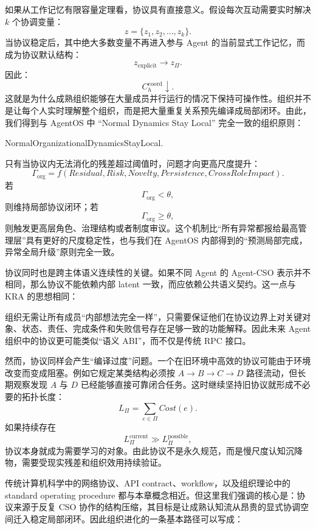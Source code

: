 如果从工作记忆有限容量定理看，协议具有直接意义。假设每次互动需要实时解决 $k$ 个协调变量：
\[
z=\{z_1,z_2,\ldots,z_k\}.
\]
当协议稳定后，其中绝大多数变量不再进入参与 Agent 的当前显式工作记忆，而成为协议默认结构：
\[
z_{\mathrm{explicit}}
\rightarrow
z_{\Pi}.
\]
因此：
\[
C_h^{\mathrm{coord}}
\downarrow.
\]
这就是为什么成熟组织能够在大量成员并行运行的情况下保持可操作性。组织并不是让每个人实时理解整个组织，而是把大量重复关系预先编译成局部闭环。由此，我们得到与 AgentOS 中 ``Normal Dynamics Stay Local'' 完全一致的组织原则：
\begin{statementbox}
NormalOrganizationalDynamicsStayLocal.
\end{statementbox}
只有当协议内无法消化的残差超过阈值时，问题才向更高尺度提升：
\[
\Gamma_{\mathrm{org}}
=
f(
Residual,
Risk,
Novelty,
Persistence,
CrossRoleImpact
).
\]
若
\[
\Gamma_{\mathrm{org}}<\theta,
\]
则维持局部协议闭环；若
\[
\Gamma_{\mathrm{org}}\geq\theta,
\]
则触发更高层角色、治理结构或者制度审议。这个机制比“所有异常都报给最高管理层”具有更好的尺度稳定性，也与我们在 AgentOS 内部得到的“预测局部完成，异常全局升级”原则完全一致。

协议同时也是跨主体语义连续性的关键。如果不同 Agent 的 Agent-CSO 表示并不相同，那么协议不能依赖内部 latent 一致，而应依赖公共语义契约。这一点与 KRA 的思想相同：
\begin{statementbox}
\centering
{}
\end{statementbox}
组织无需让所有成员“内部想法完全一样”，只需要保证他们在协议边界上对关键对象、状态、责任、完成条件和失败信号存在足够一致的功能解释。因此未来 Agent 组织中的协议更可能类似“语义 ABI”，而不仅是传统 RPC 接口。

然而，协议同样会产生“编译过度”问题。一个在旧环境中高效的协议可能由于环境改变而变成阻塞。例如它规定某类结构必须按 $A\rightarrow B\rightarrow C\rightarrow D$ 路径流动，但长期观察发现 $A$ 与 $D$ 已经能够直接可靠闭合任务。这时继续坚持旧协议就形成不必要的拓扑长度：
\[
L_{\Pi}
=
\sum_{e\in\Pi}
Cost(e).
\]
如果持续存在
\[
L_{\Pi}^{\mathrm{current}}
\gg
L_{\Pi}^{\mathrm{possible}},
\]
协议本身就成为需要学习的对象。由此协议不是永久规范，而是慢尺度认知沉降物，需要受现实残差和组织效用持续验证。

传统计算机科学中的网络协议、API contract、workflow，以及组织理论中的 standard operating procedure 都与本章概念相近。但这里我们强调的核心是：协议来源于反复 CSO 协作的结构压缩，其目标是让成熟认知流从昂贵的显式协调空间迁入稳定局部闭环。因此组织进化的一条基本路径可以写成：
\begin{statementbox}
\centering
{}
\end{statementbox}


